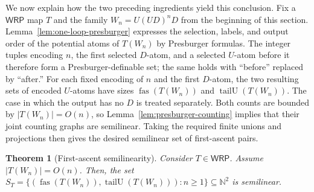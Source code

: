 \documentclass[11pt]{article}
\newtheorem{theorem}{Theorem}[section]
\theoremstyle{definition}
\newcommand{\N}{\mathbb N}
\newcommand{\WRP}{\mathsf{WRP}}
\newcommand{\fas}{\operatorname{fas}}
\newcommand{\tailU}{\operatorname{tailU}}
\begin{document}
We now explain how the two preceding ingredients yield this conclusion.  Fix a
$\WRP$ map $T$ and the family $W_n=U(UD)^nD$ from the beginning of this
section.
Lemma~\ref{lem:one-loop-presburger} expresses the selection, labels, and output
order of the potential atoms of $T(W_n)$ by Presburger formulas.  The integer
tuples encoding $n$, the first selected $D$-atom, and a selected
$U$-atom before it therefore form a Presburger-definable set; the same holds
with ``before'' replaced by ``after.''  For each fixed encoding of $n$ and the
first $D$-atom, the two resulting sets of encoded $U$-atoms have sizes
$\fas(T(W_n))$ and $\tailU(T(W_n))$.  The case in which the output has no $D$ is treated
separately.  Both counts are bounded by $|T(W_n)|=O(n)$, so
Lemma~\ref{lem:presburger-counting} implies that their joint counting graphs
are semilinear.  Taking the required finite unions and projections then gives
the desired semilinear set of first-ascent pairs.

\begin{theorem}[First-ascent semilinearity]
\label{thm:wrp-slice-semilinearity}
Consider $T\in\WRP$.  Assume $|T(W_n)|=O(n)$.  Then, the set
$S_T=\{(\fas(T(W_n)),\tailU(T(W_n))):n\ge 1\}\subseteq\N^2$
is semilinear.
\end{theorem}
\end{document}

